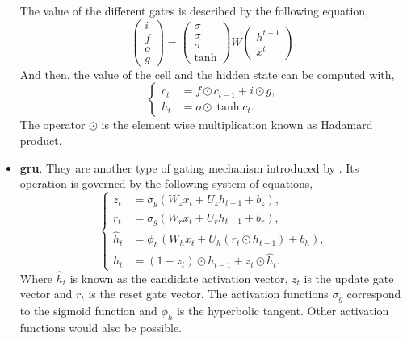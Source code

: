 \begin{itemize}
  The value of the different gates is described by the following equation,
  \begin{equation}
    \begin{pmatrix}
      i \\
      f \\
      o \\
      g
    \end{pmatrix} =
    \begin{pmatrix}
      \sigma \\
      \sigma \\
      \sigma \\
      \tanh
    \end{pmatrix}
    W
    \begin{pmatrix}
      h^{t-1} \\
      x^t
    \end{pmatrix}.
  \end{equation}
  And then, the value of the cell and the hidden state can be computed with,
  \begin{equation}
    \begin{cases}
      c_t &= f \odot c_{t-1} + i \odot g, \\
      h_t &= o \odot \tanh c_{t}.
    \end{cases}
  \end{equation}
  The operator \(\odot\) is the element wise multiplication known as Hadamard
  product.
  \item \textbf{\gls*{gru}}. They are another type of gating mechanism
  introduced by . Its operation is governed by the
  following system of equations,
  \begin{equation}
    \begin{cases}
      z_{t}&=\sigma _{g}(W_{z}x_{t}+U_{z}h_{t-1}+b_{z}), \\
      r_{t}&=\sigma _{g}(W_{r}x_{t}+U_{r}h_{t-1}+b_{r}), \\
      {\hat {h}}_{t}&=\phi _{h}(W_{h}x_{t}+U_{h}(r_{t}\odot h_{t-1})+b_{h}), \\
      h_{t}&=(1-z_{t})\odot h_{t-1}+z_{t}\odot {\hat {h}}_{t}.
    \end{cases}
  \end{equation}
  Where \(\hat{h}_t\) is known as the candidate activation vector, \(z_t\) is
  the update gate vector and \(r_t\) is the reset gate vector. The activation
  functions \(\sigma_g\) correspond to the sigmoid function and \(\phi_{h}\) is
  the hyperbolic tangent. Other activation functions would also be possible.
\end{itemize}


